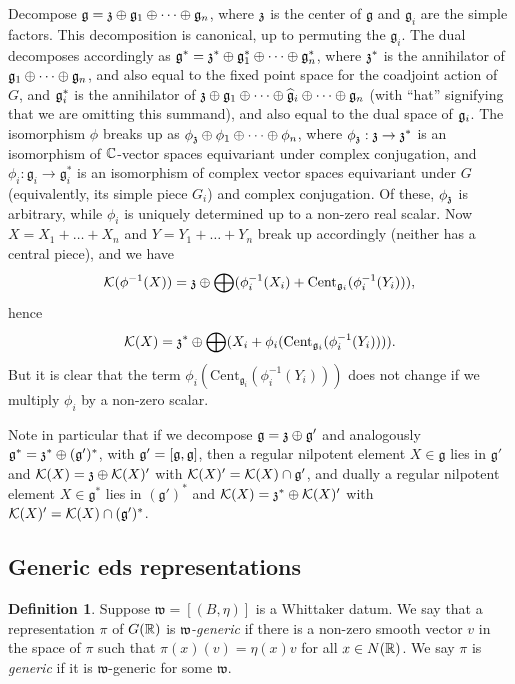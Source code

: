 \documentclass{article}
\theoremstyle{definition}
\newtheorem{dfn}[thm]{Definition}
\numberwithin{equation}{section}
\renewcommand{\-}{\hyp{}}
\newcommand{\g}{\mathfrak g}
\newcommand{\K}{\mathcal K}
\newcommand{\w}{\mathfrak w}
\newcommand{\Cent}{\mathrm{Cent}}
\begin{document}
Decompose  $\g = \mf{z} \oplus \g_1 \oplus \dots \oplus \g_n$, where $\mathfrak{z}$ is the center of $\g$ and $\g_i$ are the simple factors. This decomposition is canonical, up to permuting the $\g_i$.  The dual decomposes accordingly as $\g^*=\mf{z}^*\oplus \g_1^* \oplus \dots \oplus \g_n^*$, where $\mathfrak{z}^*$ is the annihilator of $\mathfrak{g}_1 \oplus \dots \oplus \mathfrak{g}_n$, and also equal to the fixed point space for the coadjoint action of $G$, and $\mathfrak{g}_i^*$ is the annihilator of $\mathfrak{z} \oplus \mathfrak{g}_1 \oplus \dots \oplus \mathfrak{\widehat  g}_i \oplus \dots \oplus \mathfrak{g}_n$ (with ``hat'' signifying that we are omitting this summand), and also equal to the dual space of $\mathfrak{g}_i$. The isomorphism $\phi$ breaks up as $\phi_{\mathfrak{z}}\oplus\phi_1 \oplus \dots \oplus \phi_n$, where $\phi_{\mathfrak{z}} : \mathfrak{z} \to \mathfrak{z}^*$ is an isomorphism of $\mathbb{C}$-vector spaces equivariant under complex conjugation, and $\phi_i : \g_i \to \g_i^*$ is an isomorphism of complex vector spaces equivariant under $G$ (equivalently, its simple piece $G_i$) and complex conjugation. Of these, $\phi_{\mathfrak{z}}$ is arbitrary, while $\phi_i$ is uniquely determined up to a non-zero real scalar. Now $X=X_1+\dots+X_n$ and $Y=Y_1+\dots+Y_n$ break up accordingly (neither has a central piece), and we have 
\[ \K(\phi^{-1}(X)) = \mf{z} \oplus \bigoplus (\phi_i^{-1}(X_i)+\Cent_{\g_i}(\phi_i^{-1}(Y_i))),  \]
hence
\[ \K(X) = \mf{z}^* \oplus \bigoplus (X_i+\phi_i(\Cent_{\g_i}(\phi_i^{-1}(Y_i)))). \]
But it is clear that the term $\phi_i(\Cent_{\g_i}(\phi_i^{-1}(Y_i)))$ does not change if we multiply $\phi_i$ by a non-zero scalar.

Note in particular that if we decompose $\mathfrak{g}=\mathfrak{z} \oplus \mathfrak{g}'$ and analogously $\mathfrak{g}^*=\mathfrak{z}^* \oplus (\mathfrak{g}')^*$, with $\mf{g}'=[\g,\g]$, then a regular nilpotent element $X \in \g$ lies in $\g'$ and $\K(X)=\mf{z}\oplus \K(X)'$ with $\K(X)'=\K(X) \cap \mf{g}'$, and dually a regular nilpotent element $X \in \g^*$ lies in $(\g')^*$ and $\K(X)=\mf{z}^* \oplus \K(X)'$ with $\K(X)'=\K(X) \cap (\mf{g}')^*$.

\subsection{Generic eds representations} \label{sub:gen}

\begin{dfn} \label{dfn:generic}
Suppose $\w=[(B,\eta)]$ is a Whittaker datum. We say that a representation $\pi$ of $G(\mathbb{R})$ is \emph{$\w$-generic} if there is a non-zero smooth vector $v$ in the space of $\pi$ such that $\pi(x)(v)=\eta(x)v$ for all $x\in N(\mathbb{R})$. We say $\pi$ is \emph{generic} if it is $\w$-generic for some $\w$. 
\end{dfn}
\end{document}

